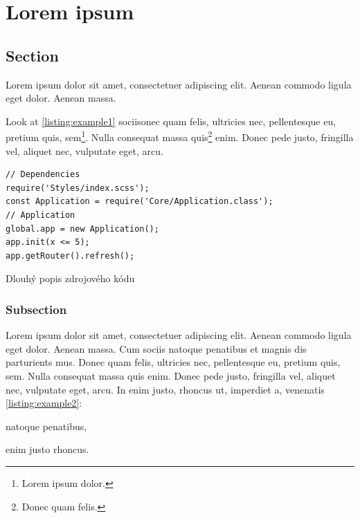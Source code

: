 \chapter{Lorem ipsum}
\section{Section}

\begin{tocheck}
	Lorem ipsum dolor sit amet, consectetuer adipiscing elit. Aenean commodo ligula eget dolor. Aenean massa.
	
	Look at \ref{listing:example1} sociisonec quam felis, ultricies nec, pellentesque eu, pretium quis, sem\footnote{Lorem ipsum dolor.}. Nulla consequat massa quis\footnote{Donec quam felis.} enim. Donec pede justo, fringilla vel, aliquet nec, vulputate eget, arcu.
\end{tocheck}

	

\begin{fig:code}
	\begin{verbatim}
// Dependencies
require('Styles/index.scss');
const Application = require('Core/Application.class');
// Application
global.app = new Application();
app.init(x <= 5);
app.getRouter().refresh();
	\end{verbatim}
	\caption[První příklad zdrojového kódu]{Dlouhý popis zdrojového kódu}\label{listing:example1}
\end{fig:code}



\subsection{Subsection}
Lorem ipsum dolor sit amet, consectetuer adipiscing elit. Aenean commodo ligula eget dolor. Aenean massa. Cum sociis natoque penatibus et magnis dis parturients mus. Donec quam felis, ultricies nec, pellentesque eu, pretium quis, sem. Nulla consequat massa quis enim. Donec pede justo, fringilla vel, aliquet nec, vulputate eget, arcu. In enim justo, rhoncus ut, imperdiet a, venenatis \ref{listing:example2}:

\begin{description}
	\setlength{\itemsep}{0.2em}
	\setlength{\parskip}{0.2em}
	\item[NEC] natoque penatibus,
	\item[Venenatis] enim justo rhoncus.
\end{description}

